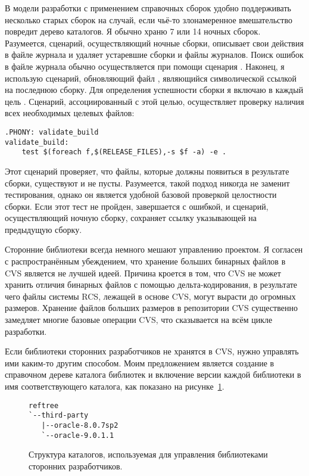 В модели разработки с применением справочных сборок удобно
поддерживать несколько старых сборок на случай, если чьё-то
злонамеренное вмешательство повредит дерево каталогов. Я обычно храню
7 или 14 ночных сборок. Разумеется, сценарий, осуществляющий ночные
сборки, описывает свои действия в файле журнала и удаляет устаревшие
сборки и файлы журналов. Поиск ошибок в файле журнала обычно
осуществляется при помощи сценария . Наконец, я использую
сценарий, обновляющий файл , являющийся символической
ссылкой на последнюю сборку. Для определения успешности сборки я
включаю в каждый \Makefile{} цель . Сценарий,
ассоциированный с этой целью, осуществляет проверку наличия всех
необходимых целевых файлов:

{\footnotesize
\begin{verbatim}
.PHONY: validate_build
validate_build:
    test $(foreach f,$(RELEASE_FILES),-s $f -a) -e .
\end{verbatim}
}

Этот сценарий проверяет, что файлы, которые должны появиться в
результате сборки, существуют и не пусты. Разумеется, такой подход
никогда не заменит тестирования, однако он является удобной базовой
проверкой целостности сборки. Если этот тест не пройден, \GNUmake{}
завершается с ошибкой, и сценарий, осуществляющий ночную сборку,
сохраняет ссылку  указывающей на предыдущую сборку.

Сторонние библиотеки всегда немного мешают управлению проектом. Я
согласен с распространённым убеждением, что хранение больших бинарных
файлов в CVS является не лучшей идеей. Причина кроется в том, что CVS
не может хранить отличия бинарных файлов с помощью
дельта\hyp{}кодирования, в результате чего файлы системы RCS, лежащей
в основе CVS, могут вырасти до огромных размеров. Хранение файлов
больших размеров в репозитории CVS существенно замедляет многие
базовые операции CVS, что сказывается на всём цикле разработки.

Если библиотеки сторонних разработчиков не хранятся в CVS, нужно
управлять ими каким-то другим способом. Моим предложением является
создание в справочном дереве каталога библиотек и включение версии
каждой библиотеки в имя соответствующего каталога, как показано на
рисунке~\ref{fig:third_party_libs}.

\begin{figure}[b]
\begin{verbatim}
reftree
`--third-party
   |--oracle-8.0.7sp2
   `--oracle-9.0.1.1
\end{verbatim}
\caption{Структура каталогов, используемая для управления библиотеками
сторонних разработчиков.}
\label{fig:third_party_libs}
\end{figure}

